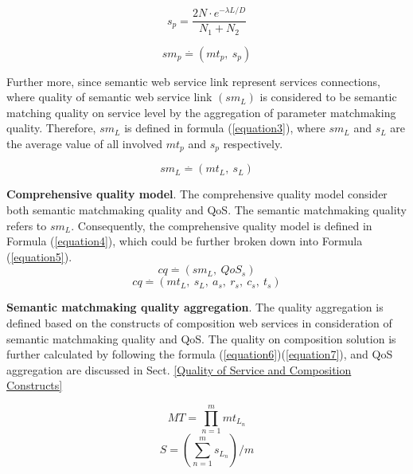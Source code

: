 \documentclass{llncs}
\begin{document}
\begin{equation}
s_{p}{=} \frac{2N \cdot e^{-\lambda L/D} }{N_{1}+N_{2}}
\label{equation1}
\end{equation}

\begin{equation}
\label{equation2}
sm_{p} \stackrel{.}{=} (mt_ {p}, \  s_ {p})
\end{equation}

Further more, since semantic web service link represent services connections, where quality of semantic web service link $(sm_{L})$ is considered to be semantic matching quality on service level by the aggregation of parameter matchmaking quality. Therefore, $sm_{L}$ is defined in formula (\ref{equation3}), where $sm_{L}$ and $s_{L}$ are the average value of all involved $mt_{p}$ and $s_{p}$ respectively. 

\begin{equation}
\label{equation3}
sm_{L} \stackrel{.}{=} (mt_ {L}, \  s_ {L})
\end{equation}

\textbf{Comprehensive quality model}. The comprehensive quality model consider both semantic matchmaking quality and QoS. The semantic matchmaking quality refers to $sm_{L}$. Consequently, the comprehensive quality model is defined in Formula (\ref{equation4}), which could be further broken down into Formula (\ref{equation5}). 
\begin{equation}
\label{equation4}
cq \stackrel{.}{=} (sm_ {L}, \  QoS_ {s})
\end{equation}
\begin{equation}
\label{equation5}
cq \stackrel{.}{=} (mt_ {L}, \  s_ {L}, \  a_{s},\  r_{s},\  c_{s},\  t_{s})
\end{equation}

\textbf{Semantic matchmaking quality aggregation}. The quality aggregation is defined based on the constructs of composition web services in consideration of semantic matchmaking quality and QoS. The quality on composition solution is further calculated by following the formula (\ref{equation6})(\ref{equation7}), and QoS aggregation are discussed in Sect. \ref{Quality of Service and Composition Constructs}

\begin{equation}
\label{equation6}
MT {=} \prod_{n=1}^{m} mt_ {L_{n}}
\end{equation}
\begin{equation}
\label{equation7}
S {=} (\sum_{n=1}^m s_ {L_{n}})/m
\end{equation}
\end{document}
